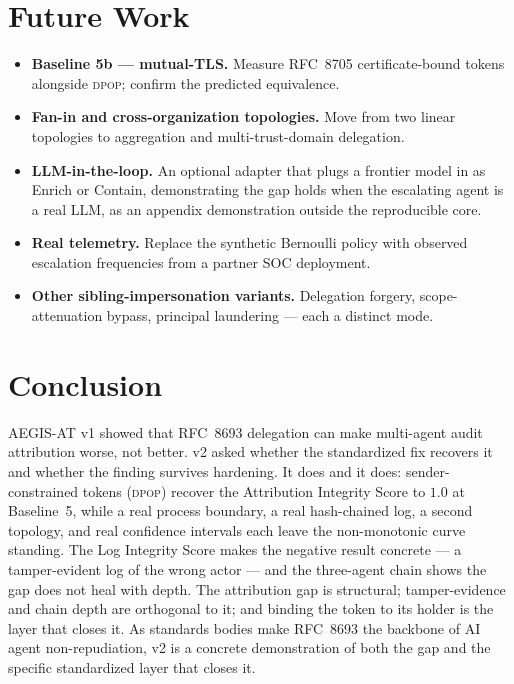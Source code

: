 \documentclass[11pt]{article}
\newcommand{\dpop}{\textsc{dpop}}
\begin{document}
\section{Future Work}
\label{sec:future}

\begin{itemize}[leftmargin=1.4em,itemsep=2pt]
  \item \textbf{Baseline 5b --- mutual-TLS.} Measure RFC~8705 certificate-bound
  tokens alongside \dpop{}; confirm the predicted equivalence.
  \item \textbf{Fan-in and cross-organization topologies.} Move from two
  linear topologies to aggregation and multi-trust-domain delegation.
  \item \textbf{LLM-in-the-loop.} An optional adapter that plugs a frontier
  model in as Enrich or Contain, demonstrating the gap holds when the
  escalating agent is a real LLM, as an appendix demonstration outside the
  reproducible core.
  \item \textbf{Real telemetry.} Replace the synthetic Bernoulli policy with
  observed escalation frequencies from a partner SOC deployment.
  \item \textbf{Other sibling-impersonation variants.} Delegation forgery,
  scope-attenuation bypass, principal laundering --- each a distinct mode.
\end{itemize}

\section{Conclusion}
\label{sec:conclusion}

AEGIS-AT v1 showed that RFC~8693 delegation can make multi-agent audit
attribution worse, not better. v2 asked whether the standardized fix recovers
it and whether the finding survives hardening. It does and it does:
sender-constrained tokens (\dpop{}) recover the Attribution Integrity Score to
$1.0$ at Baseline~5, while a real process boundary, a real hash-chained log,
a second topology, and real confidence intervals each leave the non-monotonic
curve standing. The Log Integrity Score makes the negative result concrete --- a
tamper-evident log of the wrong actor --- and the three-agent chain shows the gap
does not heal with depth. The attribution gap is structural; tamper-evidence
and chain depth are orthogonal to it; and binding the token to its holder is
the layer that closes it. As standards bodies make RFC~8693 the backbone of AI
agent non-repudiation, v2 is a concrete demonstration of both the gap and the
specific standardized layer that closes it.
\end{document}
